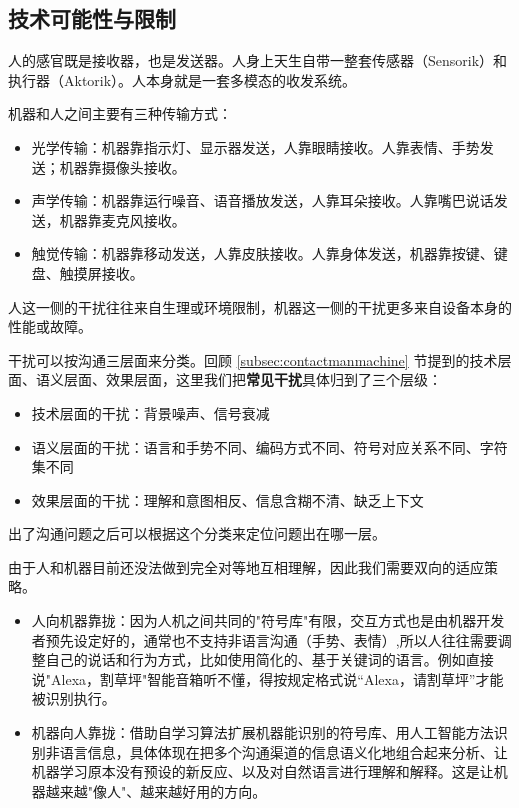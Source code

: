 \subsection{技术可能性与限制}
\label{subsec:restriktoren}

人的感官既是接收器，也是发送器。人身上天生自带一整套传感器（Sensorik）和执行器（Aktorik）。人本身就是一套多模态的收发系统。

机器和人之间主要有三种传输方式：
\begin{itemize}
    \item 光学传输：机器靠指示灯、显示器发送，人靠眼睛接收。人靠表情、手势发送；机器靠摄像头接收。
    \item 声学传输：机器靠运行噪音、语音播放发送，人靠耳朵接收。人靠嘴巴说话发送，机器靠麦克风接收。
    \item 触觉传输：机器靠移动发送，人靠皮肤接收。人靠身体发送，机器靠按键、键盘、触摸屏接收。
\end{itemize}
人这一侧的干扰往往来自生理或环境限制，机器这一侧的干扰更多来自设备本身的性能或故障。

干扰可以按沟通三层面来分类。回顾 \ref{subsec:contactmanmachine} 节提到的技术层面、语义层面、效果层面，这里我们把\textbf{常见干扰}具体归到了三个层级：
\begin{itemize}
    \item 技术层面的干扰：背景噪声、信号衰减
    \item 语义层面的干扰：语言和手势不同、编码方式不同、符号对应关系不同、字符集不同
    \item 效果层面的干扰：理解和意图相反、信息含糊不清、缺乏上下文
\end{itemize}
出了沟通问题之后可以根据这个分类来定位问题出在哪一层。

由于人和机器目前还没法做到完全对等地互相理解，因此我们需要双向的适应策略。
\begin{itemize}
    \item 人向机器靠拢：因为人机之间共同的"符号库"有限，交互方式也是由机器开发者预先设定好的，通常也不支持非语言沟通（手势、表情）,所以人往往需要调整自己的说话和行为方式，比如使用简化的、基于关键词的语言。例如直接说"Alexa，割草坪"智能音箱听不懂，得按规定格式说“Alexa，请割草坪”才能被识别执行。
    \item 机器向人靠拢：借助自学习算法扩展机器能识别的符号库、用人工智能方法识别非语言信息，具体体现在把多个沟通渠道的信息语义化地组合起来分析、让机器学习原本没有预设的新反应、以及对自然语言进行理解和解释。这是让机器越来越"像人"、越来越好用的方向。
\end{itemize}

